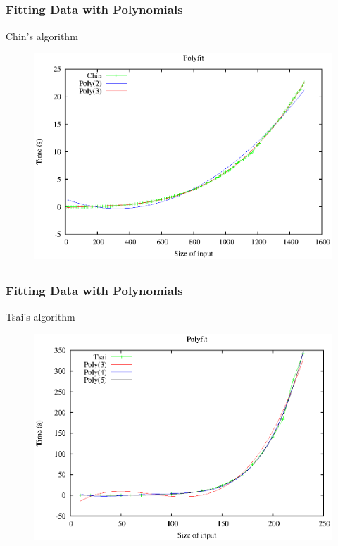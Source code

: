 \documentclass[10pt]{beamer}
\begin{document}
\subsection[Chin's algorithm]{}
\begin{frame}
  \frametitle{Fitting Data with Polynomials}
Chin's algorithm
\begin{center}
\begin{figure}[ht]
	\centering
	\includegraphics[scale=0.7]{images/polyfit-chin.eps}
\end{figure}
\end{center}
\end{frame}

\subsection[Tsai's algorithm]{}
\begin{frame}
  \frametitle{Fitting Data with Polynomials}
Tsai's algorithm
\begin{center}
\begin{figure}[ht]
	\centering
	\includegraphics[scale=0.7]{images/polyfit-tsai.eps}
\end{figure}
\end{center}
\end{frame}
\end{document}
